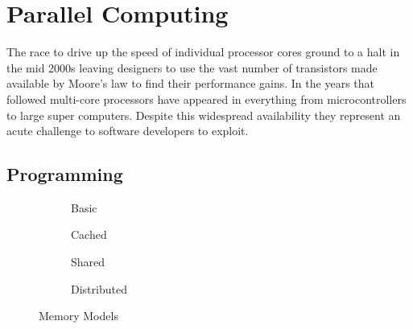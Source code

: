 	\section{Parallel Computing}
		
		The race to drive up the speed of individual processor cores ground to a
		halt in the mid 2000s leaving designers to use the vast number of
		transistors made available by Moore's law to find their performance gains.
		In the years that followed multi-core processors have appeared in everything
		from microcontrollers to large super computers. Despite this widespread
		availability they represent an acute challenge to software developers to
		exploit.
		
		\subsection{Programming}
			
			
			\begin{figure}
				\begin{subfigure}[t]{0.19\textwidth}
					\center
					
					\caption{Basic}
					\label{fig:memory-model-c}
				\end{subfigure}
				\begin{subfigure}[t]{0.19\textwidth}
					\center
					
					\caption{Cached}
					\label{fig:memory-model-cache}
				\end{subfigure}
				\begin{subfigure}[t]{0.29\textwidth}
					\center
					
					\caption{Shared}
					\label{fig:memory-model-shared-memory}
				\end{subfigure}
				\begin{subfigure}[t]{0.29\textwidth}
					\center
					
					\caption{Distributed}
					\label{fig:memory-model-distributed-memory}
				\end{subfigure}
				
				\caption{Memory Models}
				\label{fig:memory-model}
			\end{figure}
		
